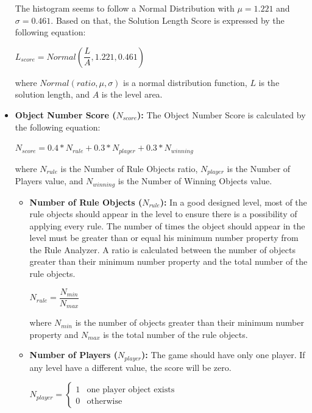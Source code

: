 \begin{itemize}
	
	The histogram seems to follow a Normal Distribution with $\mu = 1.221$ and $\sigma = 0.461$. Based on that, the Solution Length Score is expressed by the following equation:
	\begin{center}$L_{score} = Normal(\dfrac{L}{A}, 1.221, 0.461)$\end{center}
	where $Normal(ratio, \mu, \sigma)$ is a normal distribution function, $L$ is the solution length, and $A$ is the level area.
	
	\item \textbf{Object Number Score ($N_{score}$):} The Object Number Score is calculated by the following equation:
	\begin{center}$N_{score} = 0.4 * N_{rule} + 0.3 * N_{player} + 0.3 * N_{winning}$\end{center}
	where $N_{rule}$ is the Number of Rule Objects ratio, $N_{player}$ is the Number of Players value, and $N_{winning}$ is the Number of Winning Objects value.
	\begin{itemize}
		\item \textbf{Number of Rule Objects ($N_{rule}$):} In a good designed level, most of the rule objects should appear in the level to ensure there is a possibility of applying every rule. The number of times the object should appear in the level must be greater than or equal his minimum number property from the Rule Analyzer. A ratio is calculated between the number of objects greater than their minimum number property and the total number of the rule objects.
		\begin{center}$N_{rule} = \dfrac{N_{min}}{N_{max}}$\end{center}
		where $N_{min}$ is the number of objects greater than their minimum number property and $N_{max}$ is the total number of the rule objects.
		\item \textbf{Number of Players ($N_{player}$):} The game should have only one player. If any level have a different value, the score will be zero.
		\begin{center}
		$N_{player}= \begin{cases}
		               1 & \text{one player object exists}\\
		               0 & \text{otherwise}
		           \end{cases}$
		\end{center}

\end{itemize}
\end{itemize}

